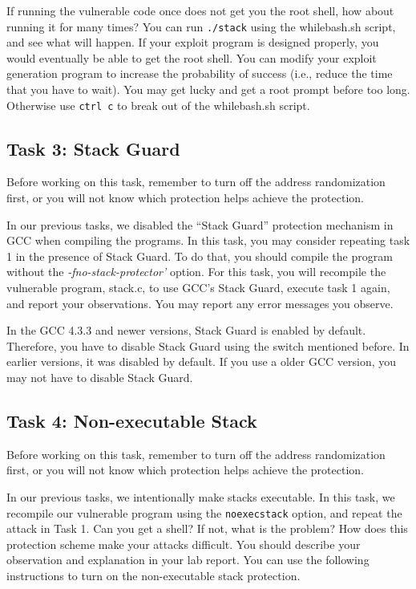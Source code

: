 If running the vulnerable code once does not get you the root shell, how 
about running it for many times? You can run {\tt ./stack} 
using the whilebash.sh script, and see what will happen. If your exploit
program is designed properly, you would eventually be able to get the root shell.
You can modify your exploit generation program to increase the
probability of success (i.e., reduce the time that you have to wait).
You may get lucky and get a root prompt before too long.  Otherwise use
{\tt ctrl c} to break out of the whilebash.sh script.

\subsection{Task 3: Stack Guard}

Before working on this task, remember to turn off the address
randomization first, or you will not know which protection helps 
achieve the protection.

In our previous tasks, we disabled the ``Stack Guard'' protection mechanism in GCC
when compiling the programs. In this task, you may consider repeating
task 1 in the presence of Stack Guard. To do that, you should compile
the program without the \emph{-fno-stack-protector'} option. For this
task, you will recompile the vulnerable program, stack.c, to use GCC's
Stack Guard, execute task 1 again, and report your observations. You
may report any error messages you observe.

In the GCC 4.3.3 and newer versions, Stack Guard is enabled by
default. Therefore, you have to disable Stack Guard using the switch
mentioned before. In earlier versions, it was disabled by default. If
you use a older GCC version, you may not have to disable Stack Guard. 

\subsection{Task 4: Non-executable Stack}

Before working on this task, remember to turn off the address
randomization first, or you will not know which protection helps 
achieve the protection.

In our previous tasks, we intentionally make stacks executable.
In this task, we recompile our vulnerable program 
using the {\tt noexecstack} option, and repeat the attack in
Task 1. Can you get a shell? If not, what is the problem? How does
this protection scheme make your attacks difficult. 
You should describe your observation and explanation
in your lab report. You can use the following instructions to turn
on the non-executable stack protection.

